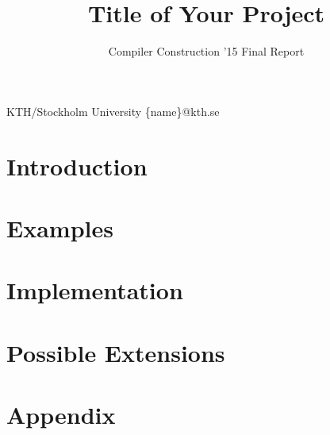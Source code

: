 \documentclass[nocopyrightspace,11pt,authoryear,preprint]{sigplanconf}
\begin{document}


\title{Title of Your Project}
\subtitle{Compiler Construction '15 Final Report}

           {KTH/Stockholm University}
           {\{name\}@kth.se}

\maketitle

\section{Introduction}


\section{Examples}


\section{Implementation}


\section{Possible Extensions}





\onecolumn
\section{Appendix}

\end{document}
